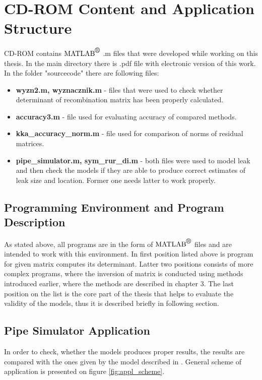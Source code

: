 \chapter{CD-ROM Content and Application Structure}

CD-ROM contains $\mbox{MATLAB}^{\mbox{\textregistered}}$ .m files that were developed while working on this thesis. In the main directory there is .pdf file with electronic version of this work. In the folder "sourcecode" there are following files:

\begin{itemize}
\item \textbf{wyzn2.m, wyznacznik.m} - files that were used to check whether determinant of recombination matrix has been properly calculated.
\item \textbf{accuracy3.m} - file used for evaluating accuracy of compared methods.
\item \textbf{kka\_accuracy\_norm.m} - file used for comparison of norms of residual matrices.
\item \textbf{pipe\_simulator.m, sym\_rur\_di.m} - both files were used to model leak and then check the models if they are able to produce correct estimates of leak size and location. Former one needs latter to work properly.

\end{itemize}

\section{Programming Environment and Program Description}

As stated above, all programs are in the form of $\mbox{MATLAB}^{\mbox{\textregistered}}$ files and are intended to work with this environment. In first position listed above is program for given matrix computes its determinant. Latter two positions consists of more complex programs, where the inversion of matrix is conducted using methods introduced earlier, where the methods are described in chapter 3. The last position on the list is the core part of the thesis that helps to evaluate the validity of the models, thus it is described briefly in following section.

\section{Pipe Simulator Application}

In order to check, whether the models produces proper results, the results are compared with the ones given by the model described in \cite{keerthi_phd}. General scheme of application is presented on figure \ref{fig:appl_scheme}.

